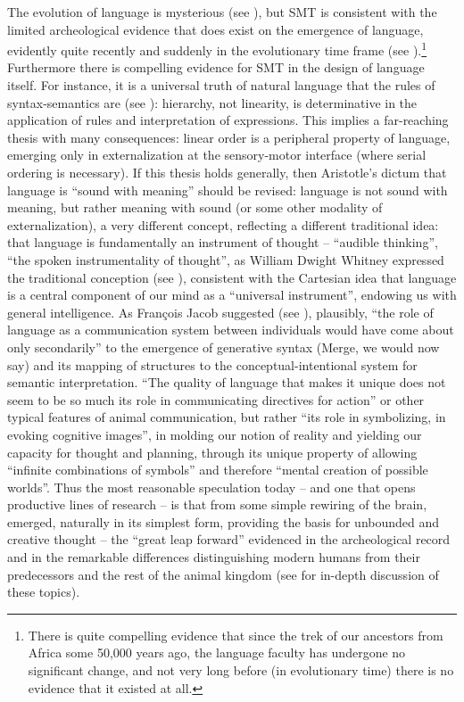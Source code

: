 \documentclass[output=paper]{langsci/langscibook}
\begin{document}
The evolution of language is mysterious (see \citealt{HauserEtAl2014}), but \gls{SMT}
is consistent with the limited archeological evidence that does exist on the
emergence of language, evidently quite recently and suddenly in the
evolutionary time frame (see \citealt{Tattersall2012}).\footnote{There is quite
    compelling evidence that since the trek of our ancestors from Africa some
    50,000 years ago, the language faculty has undergone no significant change,
    and not very long before (in evolutionary time) there is no evidence that
it existed at all.} Furthermore there is compelling evidence for \gls{SMT} in the
design of language itself. For instance, it is a universal truth of natural
language that the rules of syntax-semantics are  (see
\citealt{BerwickEtAl2011}): hierarchy, not linearity, is determinative in the
application of rules and interpretation of expressions. This implies a
far-reaching thesis with many consequences: linear order is a peripheral
property of language, emerging only in externalization at the sensory-motor
interface (where serial ordering is necessary). If this thesis holds generally,
then Aristotle’s dictum that language is “sound with meaning” should be
revised: language is not sound with meaning, but rather meaning with sound (or
some other modality of externalization), a very different concept, reflecting a
different traditional idea: that language is fundamentally an instrument of
thought – “audible thinking”, “the spoken instrumentality of thought”, as
William Dwight Whitney expressed the traditional conception (see
\citealt{Chomsky2013}), consistent with the Cartesian idea that language is a
central component of our mind as a “universal instrument”, endowing us with
general intelligence. As François Jacob suggested (see
\citealt{BerCho2011}), plausibly, “the role of language as a communication
system between individuals would have come about only secondarily” to the
emergence of generative syntax (Merge, we would now say) and its mapping of
structures to the conceptual-intentional system for semantic interpretation.
“The quality of language that makes it unique does not seem to be so much its
role in communicating directives for action” or other typical features of
animal communication, but rather “its role in symbolizing, in evoking cognitive
images”, in molding our notion of reality and yielding our capacity for thought
and planning, through its unique property of allowing “infinite combinations of
symbols” and therefore “mental creation of possible worlds”. Thus the most
reasonable speculation today – and one that opens productive lines of research
– is that from some simple rewiring of the brain,  emerged, naturally in
its simplest form, providing the basis for unbounded and creative thought – the
“great leap forward” evidenced in the archeological record and in the
remarkable differences distinguishing modern humans from their predecessors and
the rest of the animal kingdom (see \citealt{Huybregts2017,BerwickChomsky2016}
for in-depth discussion of these topics).
\end{document}
